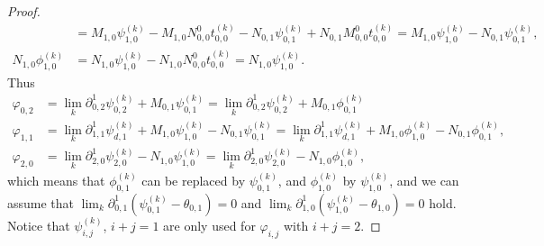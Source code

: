 \documentclass[12pt,reqno]{amsart}%
\theoremstyle{plain}
\numberwithin{theorem}{section} \numberwithin{equation}{section}
\numberwithin{lemma}{section}
\numberwithin{remark}{section}
\numberwithin{example}{section}
\numberwithin{proposition}{section}
\numberwithin{definition}{section}
\numberwithin{corollary}{section}
\begin{document}
\begin{proof}
\begin{align*}
&  =M_{1,0}\psi_{1,0}^{\left(  k\right)  }-M_{1,0}N_{0,0}^{0}t_{0,0}^{\left(
k\right)  }-N_{0,1}\psi_{0,1}^{\left(  k\right)  }+N_{0,1}M_{0,0}^{0}%
t_{0,0}^{\left(  k\right)  }=M_{1,0}\psi_{1,0}^{\left(  k\right)  }%
-N_{0,1}\psi_{0,1}^{\left(  k\right)  },\\
N_{1,0}\phi_{1,0}^{\left(  k\right)  }  &  =N_{1,0}\psi_{1,0}^{\left(
k\right)  }-N_{1,0}N_{0,0}^{0}t_{0,0}^{\left(  k\right)  }=N_{1,0}\psi
_{1,0}^{\left(  k\right)  }.
\end{align*}
Thus
\begin{align*}
\varphi_{0,2}  &  =\lim_{k}\partial_{0,2}^{1}\psi_{0,2}^{\left(  k\right)
}+M_{0,1}\psi_{0,1}^{\left(  k\right)  }=\lim_{k}\partial_{0,2}^{1}\psi
_{0,2}^{\left(  k\right)  }+M_{0,1}\phi_{0,1}^{\left(  k\right)  }\\
\varphi_{1,1}  &  =\lim_{k}\partial_{1,1}^{1}\psi_{d,1}^{\left(  k\right)
}+M_{1,0}\psi_{1,0}^{\left(  k\right)  }-N_{0,1}\psi_{0,1}^{\left(  k\right)
}=\lim_{k}\partial_{1,1}^{1}\psi_{d,1}^{\left(  k\right)  }+M_{1,0}\phi
_{1,0}^{\left(  k\right)  }-N_{0,1}\phi_{0,1}^{\left(  k\right)  },\\
\varphi_{2,0}  &  =\lim_{k}\partial_{2,0}^{1}\psi_{2,0}^{\left(  k\right)
}-N_{1,0}\psi_{1,0}^{\left(  k\right)  }=\lim_{k}\partial_{2,0}^{1}\psi
_{2,0}^{\left(  k\right)  }-N_{1,0}\phi_{1,0}^{\left(  k\right)  },
\end{align*}
which means that $\phi_{0,1}^{\left(  k\right)  }$ can be replaced by
$\psi_{0,1}^{\left(  k\right)  }$, and $\phi_{1,0}^{\left(  k\right)  }$ by
$\psi_{1,0}^{\left(  k\right)  }$, and we can assume that $\lim_{k}%
\partial_{0,1}^{1}\left(  \psi_{0,1}^{\left(  k\right)  }-\theta_{0,1}\right)
=0$ and $\lim_{k}\partial_{1,0}^{1}\left(  \psi_{1,0}^{\left(  k\right)
}-\theta_{1,0}\right)  =0$ hold. Notice that $\psi_{i,j}^{\left(  k\right)  }%
$, $i+j=1$ are only used for $\varphi_{i,j}$ with $i+j=2$.


\end{proof}
\end{document}
